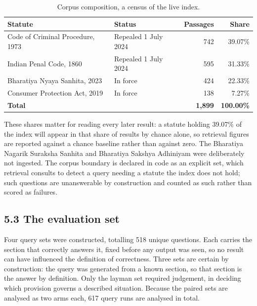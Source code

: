 \documentclass[12pt,a4paper]{article}
\begin{document}
\begin{table}[htbp]
\centering
\caption{Corpus composition, a census of the live index.}
\small
{}
\begin{tabular}{@{}p{}p{}rr@{}}
\toprule
\textbf{Statute} & \textbf{Status} & \textbf{Passages} & \textbf{Share} \\
\midrule
Code of Criminal Procedure, 1973 & Repealed 1 July 2024 & 742 & 39.07\% \\
Indian Penal Code, 1860 & Repealed 1 July 2024 & 595 & 31.33\% \\
Bharatiya Nyaya Sanhita, 2023 & In force & 424 & 22.33\% \\
Consumer Protection Act, 2019 & In force & 138 & 7.27\% \\
\midrule
\textbf{Total} &  & \textbf{1,899} & \textbf{100.00\%} \\
\bottomrule
\end{tabular}
\end{table}


These shares matter for reading every later result: a statute holding 39.07\% of the index will appear in that share of results by chance alone, so retrieval figures are reported against a chance baseline rather than against zero. The Bharatiya Nagarik Suraksha Sanhita and Bharatiya Sakshya Adhiniyam were deliberately not ingested. The corpus boundary is declared in code as an explicit set, which retrieval consults to detect a query needing a statute the index does not hold; such questions are unanswerable by construction and counted as such rather than scored as failures.

\subsection*{5.3 The evaluation set}
Four query sets were constructed, totalling 518 unique questions. Each carries the section that correctly answers it, fixed before any output was seen, so no result can have influenced the definition of correctness. Three sets are certain by construction: the query was generated from a known section, so that section is the answer by definition. Only the layman set required judgement, in deciding which provision governs a described situation. Because the paired sets are analysed as two arms each, 617 query runs are analysed in total.
\end{document}
